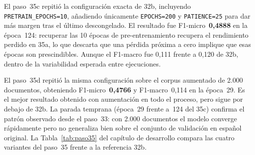 \begin{sloppypar}
El paso~35c repitió la configuración exacta de 32b, incluyendo \texttt{PRETRAIN\_EPOCHS=10}, añadiendo únicamente \texttt{EPOCHS=200} y \texttt{PATIENCE=25} para dar más margen tras el último descongelado. El resultado fue F1-micro~\textbf{0,4888} en la época~124: recuperar las 10 épocas de pre-entrenamiento recupera el rendimiento perdido en 35a, lo que descarta que una pérdida próxima a cero implique que esas épocas son prescindibles. Aunque el F1-macro fue 0,111 frente a 0,120 de 32b, dentro de la variabilidad esperada entre ejecuciones.
\end{sloppypar}

El paso~35d repitió la misma configuración sobre el corpus aumentado de 2.000 documentos, obteniendo F1-micro~\textbf{0,4766} y F1-macro~0,114 en la época~29. Es el mejor resultado obtenido con aumentación en todo el proceso, pero sigue por debajo de 32b. La parada temprana (época~29 frente a~124 del 35c) confirma el patrón observado desde el paso~33: con 2.000 documentos el modelo converge rápidamente pero no generaliza bien sobre el conjunto de validación en español original. La Tabla~\ref{tab:paso35} del capítulo de desarrollo compara las cuatro variantes del paso~35 frente a la referencia 32b.
